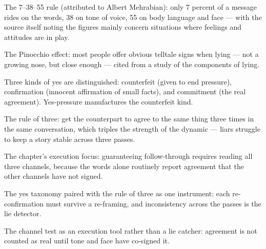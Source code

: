 

\begin{distilled}
  \item The 7--38--55 rule (attributed to Albert Mehrabian): only 7 percent of a message rides on the words, 38 on tone of voice, 55 on body language and face --- with the source itself noting the figures mainly concern situations where feelings and attitudes are in play.
  \item The Pinocchio effect: most people offer obvious telltale signs when lying --- not a growing nose, but close enough --- cited from a study of the components of lying.
  \item Three kinds of yes are distinguished: counterfeit (given to end pressure), confirmation (innocent affirmation of small facts), and commitment (the real agreement). Yes-pressure manufactures the counterfeit kind.
  \item The rule of three: get the counterpart to agree to the same thing three times in the same conversation, which triples the strength of the dynamic --- liars struggle to keep a story stable across three passes.
  \item The chapter's execution focus: guaranteeing follow-through requires reading all three channels, because the words alone routinely report agreement that the other channels have not signed.
\end{distilled}

\begin{unique}
  \item The yes taxonomy paired with the rule of three as one instrument: each re-confirmation must survive a re-framing, and inconsistency across the passes is the lie detector.
  \item The channel test as an execution tool rather than a lie catcher: agreement is not counted as real until tone and face have co-signed it.
\end{unique}
